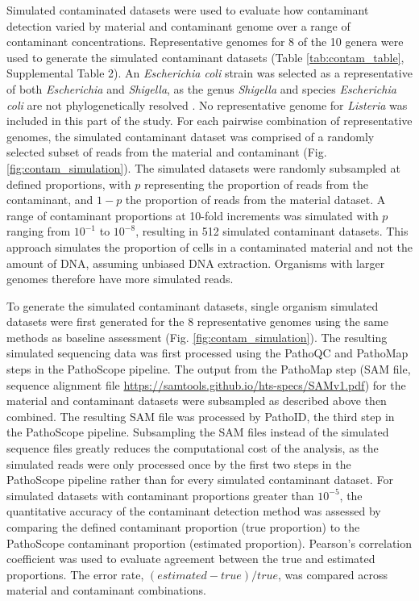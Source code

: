 \documentclass[fleqn,10pt,lineno]{wlpeerj}\usepackage[]{graphicx}\usepackage[]{color}
\begin{document}
Simulated contaminated datasets were used to evaluate how contaminant detection varied by material and contaminant genome over a range of contaminant concentrations.
Representative genomes for 8 of the 10 genera were used to generate the simulated contaminant datasets (Table \ref{tab:contam_table}, Supplemental Table 2).
An \textit{Escherichia coli} strain was selected as a representative of both \textit{Escherichia} and \textit{Shigella}, as the genus \textit{Shigella} and species \textit{Escherichia coli} are not phylogenetically resolved \citep{lan2002escherichia}. 
No representative genome for \textit{Listeria} was included in this part of the study. 
For each pairwise combination of representative genomes, the simulated contaminant dataset was comprised of a randomly selected subset of reads from the material and contaminant (Fig. \ref{fig:contam_simulation}).
The simulated datasets were randomly subsampled at defined proportions, with $p$ representing the proportion of reads from the contaminant, and $1-p$ the proportion of reads from the material dataset.
A range of contaminant proportions at 10-fold increments was simulated with $p$ ranging from $10^{-1}$ to $10^{-8}$, resulting in 512 simulated contaminant datasets.
This approach simulates the proportion of cells in a contaminated material and not the amount of DNA, assuming unbiased DNA extraction.
Organisms with larger genomes therefore have more simulated reads.


To generate the simulated contaminant datasets, single organism simulated datasets were first generated for the 8 representative genomes using the same methods as baseline assessment (Fig. \ref{fig:contam_simulation}).
The resulting simulated sequencing data was first processed using the PathoQC and PathoMap steps in the PathoScope pipeline.
The output from the PathoMap step (SAM file, sequence alignment file \url{https://samtools.github.io/hts-specs/SAMv1.pdf}) for the material and contaminant datasets were subsampled as described above then combined.
The resulting SAM file was processed by PathoID, the third step in the PathoScope pipeline.
Subsampling the SAM files instead of the simulated sequence files greatly reduces the computational cost of the analysis, as the simulated reads were only processed once by the first two steps in the PathoScope pipeline rather than for every simulated contaminant dataset. 
For simulated datasets with contaminant proportions greater than $10^{-5}$, the quantitative accuracy of the contaminant detection method was assessed by comparing the defined contaminant proportion (true proportion) to the PathoScope contaminant proportion (estimated proportion). 
Pearson's correlation coefficient was used to evaluate agreement between the true and estimated proportions. 
The error rate, $(estimated-true)/true$, was compared across material and contaminant combinations.
\end{document}
